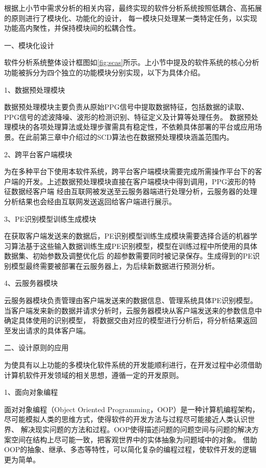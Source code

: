 根据上小节中需求分析的相关内容，最终实现的软件分析系统按照低耦合、高拓展的原则进行了模块化、功能化的设计，
每一模块只处理某一类特定任务，以实现功能高内聚性，并保持模块间的松耦合性。

一、模块化设计

软件分析系统整体设计框图如\autoref{fig:scas}所示。上小节中提及的软件系统的核心分析功能被拆分为四个独立的功能模块分别实现，以下为具体介绍。

1、数据预处理模块

数据预处理模块主要负责从原始PPG信号中提取数据特征，包括数据的读取、PPG信号的滤波降噪、波形的检测识别、特征定义及计算等处理任务。
数据预处理模块的各项处理算法或处理步骤需具有稳定性，不依赖具体部署的平台或应用场景。在此前第三章中介绍过的SCD算法也在数据预处理模块涵盖范围内。

2、跨平台客户端模块

为在多种平台下使用本软件系统，跨平台客户端模块需要完成所需操作平台下的客户端的开发。上述数据预处理模块直接在客户端模块中得到调用，PPG波形的特征数据经客户端
经由互联网被发送至云服务器端进行处理分析，云服务器的处理分析结果也会经由互联网发送返回给客户端进行展示。

3、PE识别模型训练生成模块

在获取客户端发送来的数据后，PE识别模型训练生成模块需要选择合适的机器学习算法基于这些输入数据训练生成PE识别模型，模型在训练过程中所使用的具体数据集、初始参数及调整优化后
的超参数需要同时被记录保存。生成得到的PE识别模型最终需要被部署在云服务器上，为后续新数据进行预测分析。

4、云服务器模块

云服务器模块负责管理由客户端发送来的数据信息、管理系统具体PE识别模型。当客户端发来新的数据并请求分析时，云服务器模块从客户端发送来的参数信息中确定具体使用的识别模型，
将数据交由对应的模型进行分析后，将分析结果返回至发出请求的具体客户端。

二、设计原则的应用

为使具有以上功能的多模块化软件系统的开发能顺利进行，在开发过程中必须借助计算机软件开发领域的相关思想，遵循一定的开发原则。

1、面向对象编程

面对对象编程（Object Oriented Programming，OOP）是一种计算机编程架构，尽可能模拟人类的思维方式，使得软件的开发方法与过程尽可能接近人类认识世界、
解决现实问题的方法和过程。OOP使得描述问题的问题空间与问题的解决方案空间在结构上尽可能一致，把客观世界中的实体抽象为问题域中的对象。
借助OOP的抽象、继承、多态等特性，可以简化复杂的编程过程，使软件开发的逻辑更为简单。

